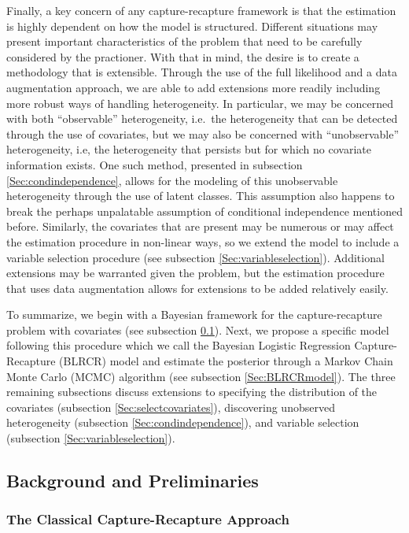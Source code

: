 \documentclass[
  12pt,
]{article}
\begin{document}
Finally, a key concern of any capture-recapture framework is that the
estimation is highly dependent on how the model is structured. Different
situations may present important characteristics of the problem that
need to be carefully considered by the practioner. With that in mind,
the desire is to create a methodology that is extensible. Through the
use of the full likelihood and a data augmentation approach, we are able
to add extensions more readily including more robust ways of handling
heterogeneity. In particular, we may be concerned with both
``observable'' heterogeneity, i.e.~the heterogeneity that can be
detected through the use of covariates, but we may also be concerned
with ``unobservable'' heterogeneity, i.e, the heterogeneity that
persists but for which no covariate information exists. One such method,
presented in subsection \ref{Sec:condindependence}, allows for the
modeling of this unobservable heterogeneity through the use of latent
classes. This assumption also happens to break the perhaps unpalatable
assumption of conditional independence mentioned before. Similarly, the
covariates that are present may be numerous or may affect the estimation
procedure in non-linear ways, so we extend the model to include a
variable selection procedure (see subsection
\ref{Sec:variableselection}). Additional extensions may be warranted
given the problem, but the estimation procedure that uses data
augmentation allows for extensions to be added relatively easily.

To summarize, we begin with a Bayesian framework for the
capture-recapture problem with covariates (see subsection
\ref{Sec:CRbackground}). Next, we propose a specific model following
this procedure which we call the Bayesian Logistic Regression
Capture-Recapture (BLRCR) model and estimate the posterior through a
Markov Chain Monte Carlo (MCMC) algorithm (see subsection
\ref{Sec:BLRCRmodel}). The three remaining subsections discuss
extensions to specifying the distribution of the covariates (subsection
\ref{Sec:selectcovariates}), discovering unobserved heterogeneity
(subsection \ref{Sec:condindependence}), and variable selection
(subsection \ref{Sec:variableselection}).

\subsection{Background and Preliminaries}
\label{Sec:CRbackground}

\subsubsection{The Classical Capture-Recapture Approach}
\label{sec:classicalCR}
\end{document}

